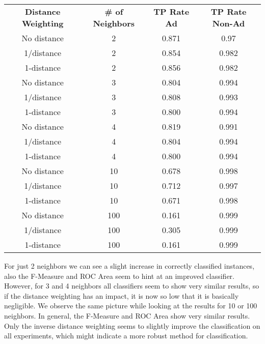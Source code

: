 \documentclass{sig-alternate-05-2015}
\begin{document}
{\begin{center}
\begin{tabular}{c | c | c | c}
\textbf{Distance Weighting} & \textbf{\# of Neighbors} & \textbf{TP Rate Ad} & \textbf{TP Rate Non-Ad}\\
No distance & 2   & 0.871 & 0.97\\
1/distance  & 2   & 0.854 & 0.982\\
1-distance  & 2   & 0.856 & 0.982\\
No distance & 3   & 0.804 & 0.994\\
1/distance  & 3   & 0.808 & 0.993\\
1-distance  & 3   & 0.800 & 0.994\\
No distance & 4   & 0.819 & 0.991\\
1/distance  & 4   & 0.804 & 0.994\\
1-distance  & 4   & 0.800 & 0.994\\
No distance & 10  & 0.678 & 0.998\\
1/distance  & 10  & 0.712 & 0.997\\
1-distance  & 10  & 0.671 & 0.998\\
No distance & 100 & 0.161 & 0.999\\
1/distance  & 100 & 0.305 & 0.999\\
1-distance  & 100 & 0.161 & 0.999\\
\end{tabular}
\end{center}

For just 2 neighbors we can see a slight increase in correctly classified instances, also the F-Measure and ROC Area seem to hint at an improved classifier. However, for 3 and 4 neighbors all classifiers seem to show very similar results, so if the distance weighting has an impact, it is now so low that it is basically negligible. We observe the same picture while looking at the results for 10 or 100 neighbors. In general, the F-Measure and ROC Area show very similar results. Only the inverse distance weighting seems to slightly improve the classification on all experiments, which might indicate a more robust method for classification. 

}
\end{document}
